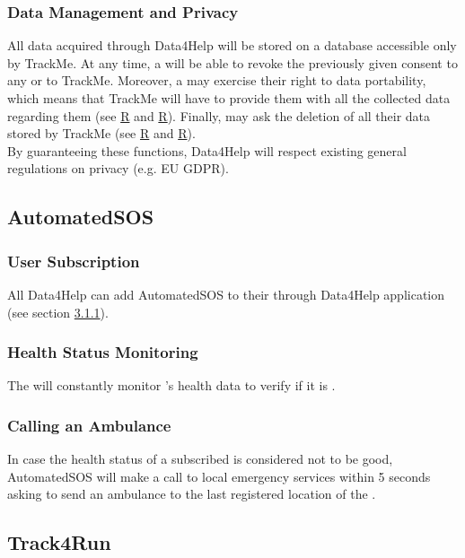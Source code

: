 \documentclass[../../rasd.tex]{subfiles}
\begin{document}
		\subsubsection{Data Management and Privacy}
		All data acquired through Data4Help will be stored on a database accessible only by TrackMe. At any time, a  will be able to revoke the previously given consent to any  or to TrackMe. Moreover, a  may exercise their right to data portability, which means that TrackMe will have to provide them with all the collected data regarding them (see \hyperref[sect:3.2.5]{R} and \hyperref[sect:3.2.5]{R}). Finally,  may ask the deletion of all their data stored by TrackMe (see \hyperref[sect:3.2.5]{R} and \hyperref[sect:3.2.5]{R}).\\
		By guaranteeing these functions, Data4Help will respect existing general regulations on privacy (e.g. EU GDPR).
	
	\subsection{AutomatedSOS}
		
		\subsubsection{User Subscription}
		All Data4Help  can add AutomatedSOS to their  through Data4Help application (see section \hyperref[sect:3.1.1]{3.1.1}).
		
		\subsubsection{Health Status Monitoring}
		The  will constantly monitor 's health data to verify if it is .
		
		\subsubsection{Calling an Ambulance}
		In case the health status of a subscribed  is considered not to be good, AutomatedSOS will make a call to local emergency services within 5 seconds asking to send an ambulance to the last registered location of the .

	\subsection{Track4Run}
		
\end{document}
